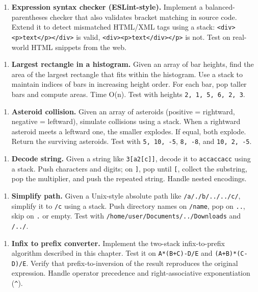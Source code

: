 \begin{enumerate}
\item \textbf{Expression syntax checker (ESLint-style).} Implement a balanced-parentheses checker that also validates bracket matching in source code. Extend it to detect mismatched HTML/XML tags using a stack: \texttt{<div><p>text</p></div>} is valid, \texttt{<div><p>text</div></p>} is not. Test on real-world HTML snippets from the web.
\end{enumerate}

\begin{enumerate}
\item \textbf{Largest rectangle in a histogram.} Given an array of bar heights, find the area of the largest rectangle that fits within the histogram. Use a stack to maintain indices of bars in increasing height order. For each bar, pop taller bars and compute areas. Time O(n). Test with heights \texttt{{2, 1, 5, 6, 2, 3}}.
\end{enumerate}

\begin{enumerate}
\item \textbf{Asteroid collision.} Given an array of asteroids (positive = rightward, negative = leftward), simulate collisions using a stack. When a rightward asteroid meets a leftward one, the smaller explodes. If equal, both explode. Return the surviving asteroids. Test with \texttt{{5, 10, -5}}, \texttt{{8, -8}}, and \texttt{{10, 2, -5}}.
\end{enumerate}

\begin{enumerate}
\item \textbf{Decode string.} Given a string like \texttt{3[a2[c]]}, decode it to \texttt{accaccacc} using a stack. Push characters and digits; on \texttt{]}, pop until \texttt{[}, collect the substring, pop the multiplier, and push the repeated string. Handle nested encodings.
\end{enumerate}

\begin{enumerate}
\item \textbf{Simplify path.} Given a Unix-style absolute path like \texttt{/a/./b/../../c/}, simplify it to \texttt{/c} using a stack. Push directory names on \texttt{/name}, pop on \texttt{..}, skip on \texttt{.} or empty. Test with \texttt{/home/user/Documents/../Downloads} and \texttt{/../}.
\end{enumerate}

\begin{enumerate}
\item \textbf{Infix to prefix converter.} Implement the two-stack infix-to-prefix algorithm described in this chapter. Test it on \texttt{A*(B+C)-D/E} and \texttt{(A+B)*(C-D)/E}. Verify that prefix-to-inversion of the result reproduces the original expression. Handle operator precedence and right-associative exponentiation (\texttt{\^{}}).
\end{enumerate}

